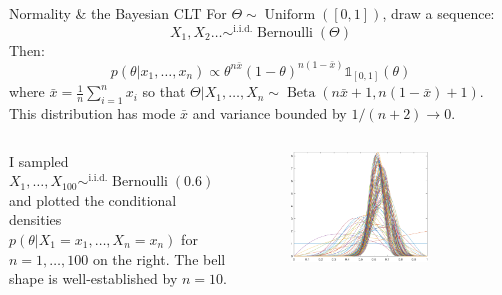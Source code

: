 \documentclass[aspectratio=169,19pt,xetex,handout]{beamer}
\begin{document}
\begin{frame}{Normality \& the Bayesian CLT}
For $\Theta\sim\operatorname{Uniform}([0,1])$, draw a sequence:
\[
X_1, X_2 \dotsc\sim^\text{i.i.d.}\operatorname{Bernoulli}(\Theta)
\]
Then:
\[
p(\theta | x_1,\dotsc, x_n)
 \propto \theta^{n\bar x} (1-\theta)^{n(1-\bar x) } \mathds{1}_{[0,1]}(\theta)
\]
where $\bar x =  \tfrac{1}{n}\sum_{i=1}^n x_i$ so that $\Theta|X_1,\dotsc,X_n \sim \operatorname{Beta}(n\bar x+1, n(1-\bar x)+1)$.  This distribution has mode $\bar x$ and variance bounded by $1/(n+2)\to 0$.

\begin{columns}
\raggedleft
I sampled $X_1,\dotsc,X_{100}\sim^\text{i.i.d.}\operatorname{Bernoulli}(0.6)$ and plotted the conditional densities $p(\theta|X_1=x_1,\dotsc,X_n=x_n)$ for $n=1,\dotsc, 100$ on the right.  The bell shape is well-established by $n=10$.


\begin{figure}
\raggedright
\includegraphics[width=0.75\textwidth]{bvm}
\end{figure}
\end{columns}



\end{frame}
\end{document}
